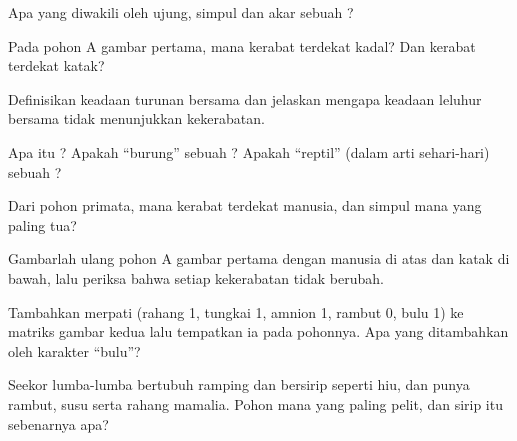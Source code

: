 \begin{exercise}[$\star$]\label{exo:g12:phylogenetic-trees:1}
Apa yang diwakili oleh ujung, simpul dan akar sebuah ?
\end{exercise}

\begin{exercise}[$\star$]\label{exo:g12:phylogenetic-trees:2}
Pada pohon A gambar pertama,  mana kerabat terdekat kadal? Dan
kerabat terdekat katak?
\end{exercise}

\begin{exercise}[$\star$]\label{exo:g12:phylogenetic-trees:3}
Definisikan keadaan turunan bersama dan jelaskan mengapa keadaan
leluhur bersama tidak menunjukkan kekerabatan.
\end{exercise}

\begin{exercise}[$\star$]\label{exo:g12:phylogenetic-trees:4}
Apa itu ? Apakah ``burung'' sebuah ? Apakah ``reptil'' (dalam
arti sehari-hari) sebuah ?
\end{exercise}

\begin{exercise}[$\star$]\label{exo:g12:phylogenetic-trees:5}
Dari pohon primata, mana kerabat terdekat manusia, dan simpul mana
yang paling tua?
\end{exercise}

\begin{exercise}[$\star\star$]\label{exo:g12:phylogenetic-trees:6}
Gambarlah ulang pohon A gambar pertama dengan manusia di atas dan
katak di bawah, lalu periksa bahwa setiap kekerabatan tidak berubah.
\end{exercise}

\begin{exercise}[$\star\star$]\label{exo:g12:phylogenetic-trees:7}
Tambahkan merpati (rahang 1, tungkai 1, amnion 1, rambut 0, bulu 1) ke
matriks gambar kedua lalu tempatkan ia pada pohonnya. Apa yang
ditambahkan oleh karakter ``bulu''?
\end{exercise}

\begin{exercise}[$\star\star$]\label{exo:g12:phylogenetic-trees:8}
Seekor lumba-lumba bertubuh ramping dan bersirip seperti hiu, dan
punya rambut, susu serta rahang mamalia. Pohon mana yang paling pelit,
dan sirip itu sebenarnya apa?
\end{exercise}

